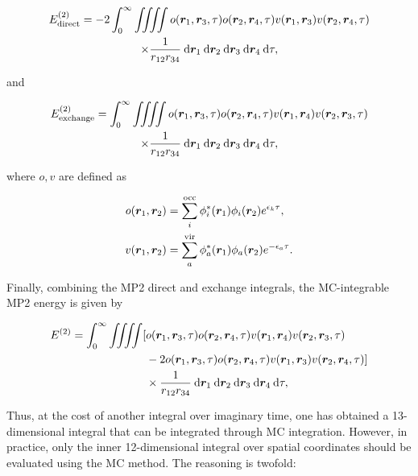 \begin{multline}
\perturbE[\text{direct}]{2}
=
-2
\int_0^\infty
\iiiint
o(\bm r_1, \bm r_3, \tau) o(\bm r_2, \bm r_4, \tau) v(\bm r_1, \bm r_3) v(\bm r_2, \bm r_4, \tau)
\\
\times \frac{1}{r_{12}r_{34}}
\dif\bm r_1 \dif\bm r_2 \dif\bm r_3 \dif\bm r_4 \dif\tau,
\label{eq:mcmp2-dir}
\end{multline}

\noindent and

\begin{multline}
\perturbE[\text{exchange}]{2}
=
\int_0^\infty
\iiiint
o(\bm r_1, \bm r_3, \tau) o(\bm r_2, \bm r_4, \tau) v(\bm r_1, \bm r_4) v(\bm r_2, \bm r_3, \tau)
\\
\times \frac{1}{r_{12}r_{34}}
\dif\bm r_1 \dif\bm r_2 \dif\bm r_3 \dif\bm r_4 \dif\tau,
\label{eq:mcmp2-exch}
\end{multline}

\noindent where $o, v$ are defined as

\begin{align}
o(\bm r_1, \bm r_2)
&=
\sum_i^\text{occ}
\phi_i^*(\bm r_1) \phi_i(\bm r_2) e^{\epsilon_k \tau},
\\
v(\bm r_1, \bm r_2)
&=
\sum_a^\text{vir}
\phi_a^*(\bm r_1) \phi_a(\bm r_2) e^{- \epsilon_a \tau}.
\end{align}

Finally, combining the MP2 direct and exchange integrals, the MC-integrable MP2
energy is given by

\begin{equation}
\begin{split}
\perturbE[]{2}
=
\int_0^\infty
\iiiint
[
&o(\bm r_1, \bm r_3, \tau) o(\bm r_2, \bm r_4, \tau) v(\bm r_1, \bm r_4) v(\bm r_2, \bm r_3, \tau)
\\
& - 2 o(\bm r_1, \bm r_3, \tau) o(\bm r_2, \bm r_4, \tau) v(\bm r_1, \bm r_3) v(\bm r_2, \bm r_4, \tau)
]
\\
& \times \frac{1}{r_{12}r_{34}}
\dif\bm r_1 \dif\bm r_2 \dif\bm r_3 \dif\bm r_4 \dif\tau,
\label{eq:mcmp2}
\end{split}
\end{equation}

\noindent Thus, at the cost of another integral over imaginary time, one has obtained a
13-dimensional integral that can be integrated through MC integration.  However,
in practice, only the inner 12-dimensional integral over spatial coordinates
should be evaluated using the MC method. The reasoning is twofold:

